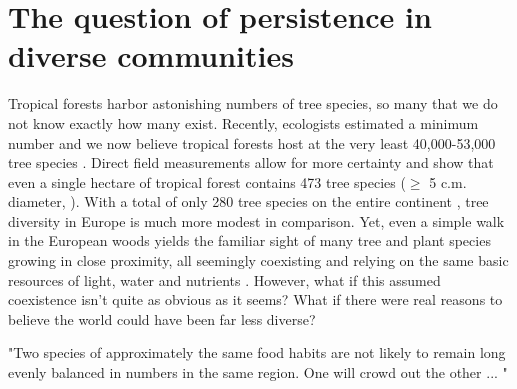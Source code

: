 \documentclass[b5paper,justified]{tufte-book} %
\begin{document}
\vline

\section{The question of persistence in diverse communities}
Tropical forests harbor astonishing numbers of tree species, so many that we do not know exactly how many exist. Recently, ecologists estimated a minimum number and we now believe tropical forests host at the very least 40,000-53,000 tree species \citep{Slik2015}. Direct field measurements allow for more certainty and show that even a single hectare of tropical forest contains 473 tree species ($\geq$ 5 c.m. diameter, \citealt{Valencia1994}).  With a total of only 280 tree species on the entire continent \citep{FAO2006}, tree diversity in Europe is much more modest in comparison. Yet, even a simple walk in the European woods yields the familiar sight of many tree and plant species growing in close proximity, all seemingly coexisting and relying on the same basic resources of light, water and nutrients \citep{Silvertown2004}. However, what if this assumed coexistence isn't quite as obvious as it seems? What if there were real reasons to believe the world could have been far less diverse? 

\begin{minipage}{14cm} 
\vspace*{1cm}
\large "Two species of approximately the same food habits are not likely to remain long evenly balanced in numbers in the same region. One will crowd out the other ... " 
\linebreak \textbf{\citealt{Grinnell1904}}
\end{minipage}
\vspace{1cm}
\end{document}
